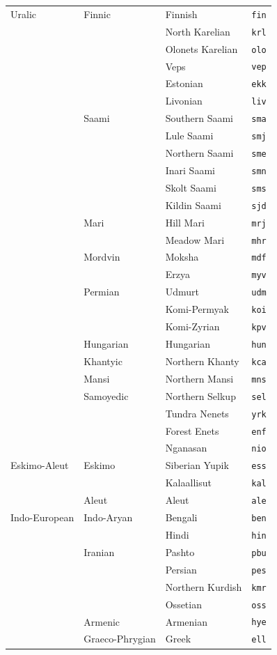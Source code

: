 \begin{center}
\begin{longtable}{llll}
Uralic&Finnic&Finnish&\texttt{fin}\\
&&North Karelian&\texttt{krl}\\
&&Olonets Karelian&\texttt{olo}\\
&&Veps&\texttt{vep}\\
&&Estonian&\texttt{ekk}\\
&&Livonian&\texttt{liv}\\
&Saami&Southern Saami&\texttt{sma}\\
&&Lule Saami&\texttt{smj}\\
&&Northern Saami&\texttt{sme}\\
&&Inari Saami&\texttt{smn}\\
&&Skolt Saami&\texttt{sms}\\
&&Kildin Saami&\texttt{sjd}\\
&Mari&Hill Mari&\texttt{mrj}\\
&&Meadow Mari&\texttt{mhr}\\
&Mordvin&Moksha&\texttt{mdf}\\
&&Erzya&\texttt{myv}\\
&Permian&Udmurt&\texttt{udm}\\
&&Komi-Permyak&\texttt{koi}\\
&&Komi-Zyrian&\texttt{kpv}\\
&Hungarian&Hungarian&\texttt{hun}\\
&Khantyic&Northern Khanty&\texttt{kca}\\
&Mansi&Northern Mansi&\texttt{mns}\\
&Samoyedic&Northern Selkup&\texttt{sel}\\
&&Tundra Nenets&\texttt{yrk}\\
&&Forest Enets&\texttt{enf}\\
&&Nganasan&\texttt{nio}\\
\hline
Eskimo-Aleut&Eskimo&Siberian Yupik&\texttt{ess}\\
&&Kalaallisut&\texttt{kal}\\
&Aleut&Aleut&\texttt{ale}\\
Indo-European&Indo-Aryan&Bengali&\texttt{ben}\\
&&Hindi&\texttt{hin}\\
&Iranian&Pashto&\texttt{pbu}\\
&&Persian&\texttt{pes}\\
&&Northern Kurdish&\texttt{kmr}\\
&&Ossetian&\texttt{oss}\\
&Armenic&Armenian&\texttt{hye}\\
&Graeco-Phrygian&Greek&\texttt{ell}\\

\end{longtable}
\end{center}
